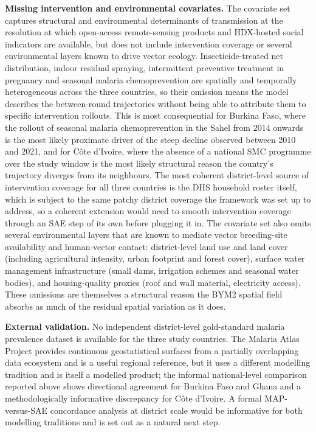 \documentclass{article}
\begin{document}
\textbf{Missing intervention and environmental covariates.} The
covariate set captures structural and environmental determinants of
transmission at the resolution at which open-access remote-sensing
products and HDX-hosted social indicators are available, but does not
include intervention coverage or several environmental layers known to
drive vector ecology. Insecticide-treated net distribution, indoor
residual spraying, intermittent preventive treatment in pregnancy and
seasonal malaria chemoprevention are spatially and temporally
heterogeneous across the three countries, so their omission means the
model describes the between-round trajectories without being able to
attribute them to specific intervention rollouts. This is most
consequential for Burkina Faso, where the rollout of seasonal malaria
chemoprevention in the Sahel from 2014 onwards is the most likely
proximate driver of the steep decline observed between 2010 and 2021,
and for Côte d'Ivoire, where the absence of a national SMC programme
over the study window is the most likely structural reason the country's
trajectory diverges from its neighbours. The most coherent
district-level source of intervention coverage for all three countries
is the DHS household roster itself, which is subject to the same patchy
district coverage the framework was set up to address, so a coherent
extension would need to smooth intervention coverage through an SAE step
of its own before plugging it in. The covariate set also omits several
environmental layers that are known to mediate vector breeding-site
availability and human-vector contact: district-level land use and land
cover (including agricultural intensity, urban footprint and forest
cover), surface water management infrastructure (small dams, irrigation
schemes and seasonal water bodies), and housing-quality proxies (roof
and wall material, electricity access). These omissions are themselves a
structural reason the BYM2 spatial field absorbs as much of the residual
spatial variation as it does.

\textbf{External validation.} No independent district-level
gold-standard malaria prevalence dataset is available for the three
study countries. The Malaria Atlas Project provides continuous
geostatistical surfaces from a partially overlapping data ecosystem and
is a useful regional reference, but it uses a different modelling
tradition and is itself a modelled product; the informal national-level
comparison reported above shows directional agreement for Burkina Faso
and Ghana and a methodologically informative discrepancy for Côte
d'Ivoire. A formal MAP-versus-SAE concordance analysis at district scale
would be informative for both modelling traditions and is set out as a
natural next step.
\end{document}
